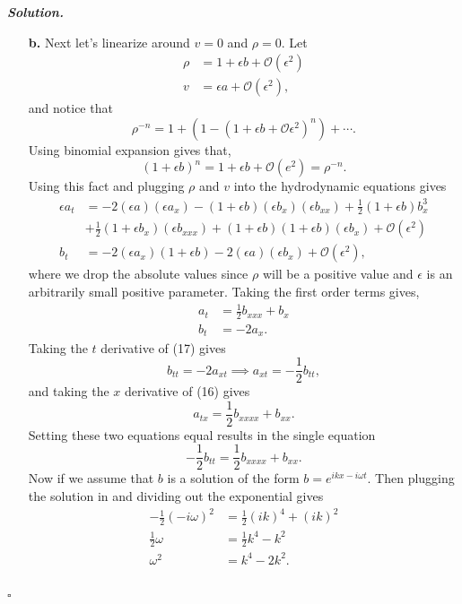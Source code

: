 \documentclass[12pt]{report}
\newenvironment{solution}[1][\it{Solution}]{\textbf{#1. } }{$\square$}
\def\eps{{\epsilon}}
\def\O{{\mathcal{O}}}
\newcommand{\paren}[1]{{\left(#1\right)}} %
\begin{document}
\begin{solution}
\begin{enumerate}
        \item[{\bf b.}]
        Next let's linearize around $v = 0$ and $\rho = 0$. Let
        \begin{align*}
            \rho &= 1 + \eps b + \O(\eps^2)\\
            v &= \eps a + \O(\eps^2),
        \end{align*}
        and notice that
        \[
            \rho^{-n} = 1 +\paren{1 - \paren{1 + \eps b + \O{\eps^2}}^n} + \cdots.
        \]
        Using binomial expansion gives that,
        \[
            (1 + \eps b)^n = 1 + \eps b + \O(e^2) = \rho^{-n}.
        \]
        Using this fact and plugging $\rho$ and $v$ into the hydrodynamic equations gives
        \begin{align*}
            \eps a_t &= -2(\eps a)(\eps a_x) - (1 + \eps b)(\eps b_x)(\eps b_{xx}) + \frac{1}{2}(1 + \eps b)b_x^3\\ 
            &+ \frac{1}{2}(1 + \eps b_x)(\eps b_{xxx}) + (1+ \eps b)(1+ \eps b)(\eps b_x)+\O(\eps^2)\\
            b_t &= -2(\eps a_x)(1 + \eps b)-2(\eps a)(\eps b_x) + \O(\eps^2),
        \end{align*}
        where we drop the absolute values since $\rho$ will be a positive value and $\eps$ is an arbitrarily small positive parameter. Taking the first order terms gives,
        \begin{align}
            a_t &= \frac{1}{2}b_{xxx} + b_x\\
            b_t &= -2a_x.
        \end{align}
        Taking the $t$ derivative of (17) gives
        \[
            b_{tt} = -2a_{xt} \implies a_{xt} = -\frac{1}{2}b_{tt},
        \]
        and taking the $x$ derivative of (16) gives
        \[
            a_{tx} = \frac{1}{2}b_{xxxx} + b_{xx}.
        \]
        Setting these two equations equal results in the single equation
        \[
            -\frac{1}{2}b_{tt} = \frac{1}{2}b_{xxxx} + b_{xx}.
        \]
        Now if we assume that $b$ is a solution of the form $b = e^{ikx - i\omega t}$. Then plugging the solution in and dividing out the exponential gives
        \begin{align*}
            -\frac{1}{2}(-i\omega)^2 &= \frac{1}{2}(ik)^4 + (ik)^2\\
            \frac{1}{2}\omega &= \frac{1}{2}k^4 - k^2\\
            \omega^2 &= k^4 - 2k^2.\\
        \end{align*}

\end{enumerate}
\end{solution}
\end{document}
